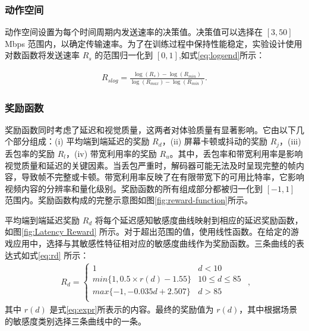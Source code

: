 \subsubsection{动作空间}
动作空间设置为每个时间周期内发送速率的决策值。决策值可以选择在 $[3, 50]$ Mbps 范围内，以确定传输速率。为了在训练过程中保持性能稳定，实验设计使用对数函数将发送速率 $R_s$ 的范围归一化到 $[0, 1]$,如式\eqref{eq:logsend}所示：

\begin{equation}
\begin{aligned}
    R_{slog} = \frac{\log(R_s)-\log(R_{min})}{\log(R_{max})-\log(R_{min})}.
\end{aligned}
\label{eq:logsend}
\end{equation} 

\subsubsection{奖励函数}
奖励函数同时考虑了延迟和视觉质量，这两者对体验质量有显著影响。它由以下几个部分组成：(i) 平均端到端延迟的奖励 $R_d$，(ii) 屏幕卡顿或抖动的奖励 $R_j$，(iii) 丢包率的奖励 $R_l$，(iv) 带宽利用率的奖励 $R_u$。其中，丢包率和带宽利用率是影响视觉质量和延迟的关键因素。当丢包严重时，解码器可能无法及时呈现完整的帧内容，导致帧不完整或卡顿。带宽利用率反映了在有限带宽下的可用比特率，它影响视频内容的分辨率和量化级别。奖励函数的所有组成部分都被归一化到 $[-1, 1]$ 范围内。奖励函数构成的完整示意图如图\ref{fig:reward-function}所示。






平均端到端延迟奖励 $R_d$ 将每个延迟感知敏感度曲线映射到相应的延迟奖励函数，如图\ref{fig:Latency Reward} 所示。对于超出范围的值，使用线性函数。在给定的游戏应用中，选择与其敏感性特征相对应的敏感度曲线作为奖励函数。三条曲线的表达式如式\eqref{eq:rd} 所示：
\begin{equation}
\begin{aligned}
R_{d} = 
    \begin{cases}
        1 & d < 10\\
        min\{1,0.5 \times r(d) - 1.55 \}& 10 \leq d \leq 85 \\
        max\{-1,- 0.035d +2.507\} & d > 85\\
\end{cases}
\end{aligned}
,
\label{eq:rd}
\end{equation}
其中 $r(d)$ 是式\eqref{eq:expr}所表示的内容。最终的奖励值为 $r(d)$，其中根据场景的敏感度类别选择三条曲线中的一条。

